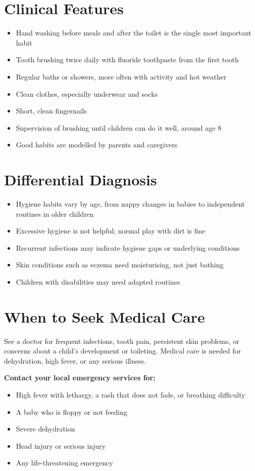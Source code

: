 \section*{Clinical Features}
\begin{itemize}
    \item Hand washing before meals and after the toilet is the single most important habit
    \item Tooth brushing twice daily with fluoride toothpaste from the first tooth
    \item Regular baths or showers, more often with activity and hot weather
    \item Clean clothes, especially underwear and socks
    \item Short, clean fingernails
    \item Supervision of brushing until children can do it well, around age 8
    \item Good habits are modelled by parents and caregivers
\end{itemize}

\section*{Differential Diagnosis}
\begin{itemize}
    \item Hygiene habits vary by age, from nappy changes in babies to independent routines in older children
    \item Excessive hygiene is not helpful; normal play with dirt is fine
    \item Recurrent infections may indicate hygiene gaps or underlying conditions
    \item Skin conditions such as eczema need moisturising, not just bathing
    \item Children with disabilities may need adapted routines
\end{itemize}

\section*{When to Seek Medical Care}
See a doctor for frequent infections, tooth pain, persistent skin problems, or concerns about a child's development or toileting. Medical care is needed for dehydration, high fever, or any serious illness.

\textbf{Contact your local emergency services for:}
\begin{itemize}
    \item High fever with lethargy, a rash that does not fade, or breathing difficulty
    \item A baby who is floppy or not feeding
    \item Severe dehydration
    \item Head injury or serious injury
    \item Any life-threatening emergency
\end{itemize}

